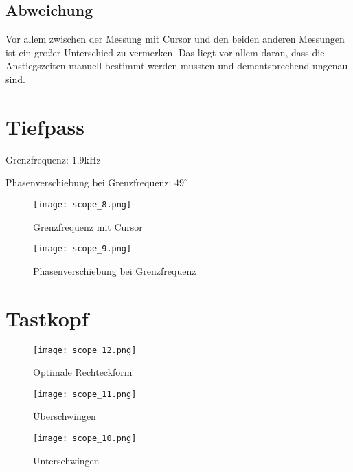 \documentclass[10pt]{report}
\begin{document}
      \subsection{Abweichung}
      Vor allem zwischen der Messung mit Cursor und den beiden anderen Messungen
      ist ein großer Unterschied zu vermerken. Das liegt vor allem daran, dass die
      Anstiegszeiten manuell bestimmt werden mussten und dementsprechend ungenau sind.


      \section{Tiefpass}
      Grenzfrequenz: $1.9$kHz

      \noindent Phasenverschiebung bei Grenzfrequenz: $49^\circ$
      \begin{figure}
       \texttt{[image: scope\_8.png]}
       \caption{Grenzfrequenz mit Cursor}
     \end{figure}

     \begin{figure}
      \texttt{[image: scope\_9.png]}
      \caption{Phasenverschiebung bei Grenzfrequenz}
    \end{figure}

    \section{Tastkopf}
    \begin{figure}
     \texttt{[image: scope\_12.png]}
     \caption{Optimale Rechteckform}
   \end{figure}

   \begin{figure}
    \texttt{[image: scope\_11.png]}
    \caption{Überschwingen}
  \end{figure}

  \begin{figure}
   \texttt{[image: scope\_10.png]}
   \caption{Unterschwingen}
 \end{figure}
\end{document}
